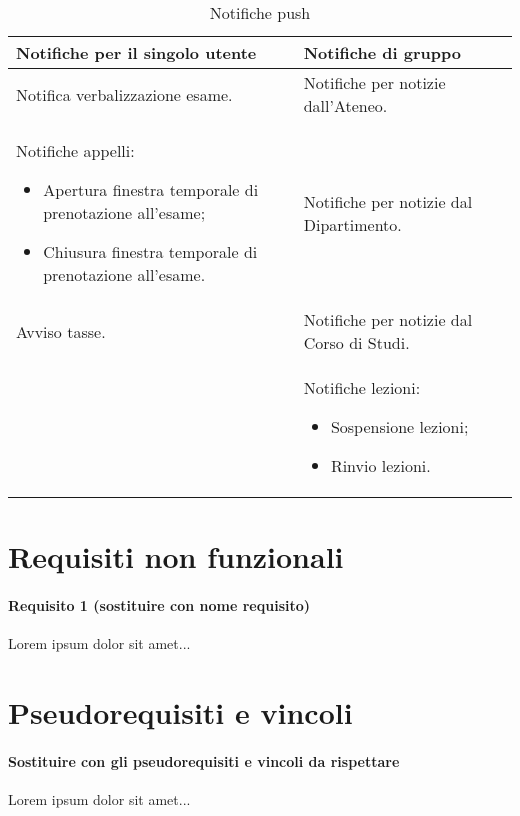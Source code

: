 \begin{table}
\small %
\caption{Notifiche push} %
\label{tab:gruppo-2-notifiche-push} %
\begin{tabular}{| p{} | p{} |}
	\hline
	\textbf{Notifiche per il singolo utente} & \textbf{Notifiche di gruppo} \\
	\hline
	Notifica verbalizzazione esame. & Notifiche per notizie dall'Ateneo. \\
	\hline
	Notifiche appelli:
	\begin{itemize}[noitemsep,topsep=0pt,parsep=0pt,partopsep=0pt]
	\item Apertura finestra temporale di prenotazione all'esame;
	\item Chiusura finestra temporale di prenotazione all'esame.
	\end{itemize} &
	Notifiche per notizie dal Dipartimento. \\
	\hline
	Avviso tasse. & Notifiche per notizie dal Corso di Studi. \\
	\hline
	& Notifiche lezioni:
	\begin{itemize}[noitemsep,topsep=0pt,parsep=0pt,partopsep=0pt]
	\item Sospensione lezioni;
	\item Rinvio lezioni.
	\end{itemize} \\
	\hline
\end{tabular}
\end{table}

\section{Requisiti non funzionali}

\paragraph{Requisito 1 (sostituire con nome requisito) \\} 
Lorem ipsum dolor sit amet...

\section{Pseudorequisiti e vincoli}
\paragraph{Sostituire con gli pseudorequisiti e vincoli da rispettare \\}
Lorem ipsum dolor sit amet...

\clearpage